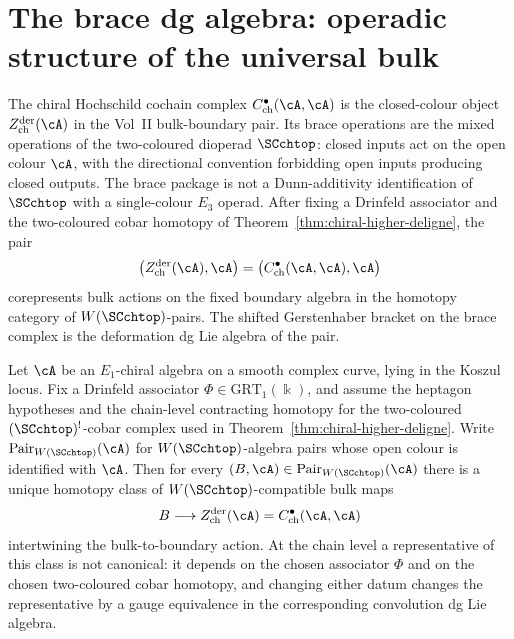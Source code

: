 \providecommand{\cF}{\mathcal{F}}
\providecommand{\Barch}{\overline{B}^{\mathrm{ch}}}
\section{The brace dg algebra: operadic structure of the universal bulk}
\label{sec:chiral-Hochschild-brace}
\label{ch:brace}%

The chiral Hochschild cochain complex
$C^\bullet_{\mathrm{ch}}(\cA,\cA)$ is the closed-colour object
$Z^{\mathrm{der}}_{\mathrm{ch}}(\cA)$ in the Vol~II
bulk-boundary pair. Its brace operations are the mixed operations of
the two-coloured dioperad $\SCchtop$: closed inputs act on the open
colour $\cA$, with the directional convention forbidding open inputs producing closed outputs. The brace package is not a Dunn-additivity
identification of $\SCchtop$ with a single-colour $E_3$ operad.
After fixing a Drinfeld associator and the two-coloured cobar homotopy of
Theorem~\ref{thm:chiral-higher-deligne}, the pair
\[
\bigl(Z^{\mathrm{der}}_{\mathrm{ch}}(\cA),\cA\bigr)
=
\bigl(C^\bullet_{\mathrm{ch}}(\cA,\cA),\cA\bigr)
\]
corepresents bulk actions on the fixed boundary algebra in the
homotopy category of $W(\SCchtop)$-pairs. The shifted
Gerstenhaber bracket on the brace complex is the deformation
dg Lie algebra of the pair.

\begin{theorem}%
\label{thm:universal-brace-pair}%
%
%
Let $\cA$ be an $E_1$-chiral algebra on a smooth complex curve,
lying in the Koszul locus. Fix a Drinfeld associator
$\Phi\in\mathrm{GRT}_1(\Bbbk)$, and assume the heptagon hypotheses
and the chain-level contracting homotopy for the two-coloured
$(\SCchtop)^!$-cobar complex used in
Theorem~\ref{thm:chiral-higher-deligne}. Write
$\mathrm{Pair}_{W(\SCchtop)}(\cA)$ for $W(\SCchtop)$-algebra pairs
whose open colour is identified with $\cA$. Then for every
$(B,\cA)\in\mathrm{Pair}_{W(\SCchtop)}(\cA)$ there is a unique
homotopy class of $W(\SCchtop)$-compatible bulk maps
\[
B\longrightarrow Z^{\mathrm{der}}_{\mathrm{ch}}(\cA)
=C^\bullet_{\mathrm{ch}}(\cA,\cA)
\]
intertwining the bulk-to-boundary action. At the chain level a
representative of this class is not canonical: it depends on the
chosen associator $\Phi$ and on the chosen two-coloured cobar
homotopy, and changing either datum changes the representative by a
gauge equivalence in the corresponding convolution dg Lie algebra.
\end{theorem}

